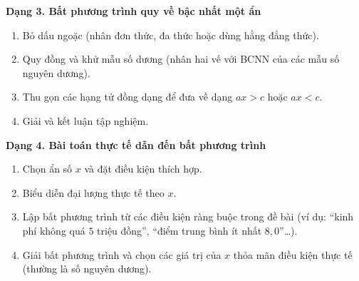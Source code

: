 \textbf{Dạng 3. Bất phương trình quy về bậc nhất một ẩn}
\begin{enumerate}
\item Bỏ dấu ngoặc (nhân đơn thức, đa thức hoặc dùng hằng đẳng thức).
\item Quy đồng và khử mẫu số dương (nhân hai vế với BCNN của các mẫu số nguyên dương).
\item Thu gọn các hạng tử đồng dạng để đưa về dạng $ax > c$ hoặc $ax < c$.
\item Giải và kết luận tập nghiệm.
\end{enumerate}

\textbf{Dạng 4. Bài toán thực tế dẫn đến bất phương trình}
\begin{enumerate}
\item Chọn ẩn số $x$ và đặt điều kiện thích hợp.
\item Biểu diễn đại lượng thực tế theo $x$.
\item Lập bất phương trình từ các điều kiện ràng buộc trong đề bài (ví dụ: ``kinh phí không quá $5$ triệu đồng'', ``điểm trung bình ít nhất $8{,}0$''\dots).
\item Giải bất phương trình và chọn các giá trị của $x$ thỏa mãn điều kiện thực tế (thường là số nguyên dương).
\end{enumerate}
